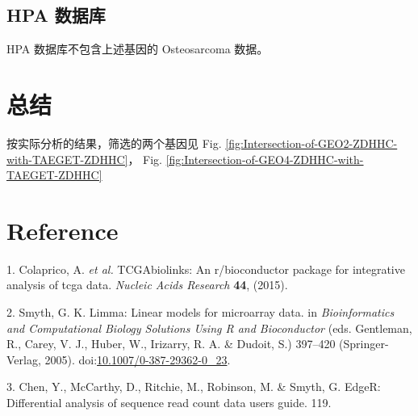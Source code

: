 \documentclass[
]{article}
\newenvironment{cslreferences}%
  {}%
  {\par}
\begin{document}
\hypertarget{hpa-ux6570ux636eux5e93}{%
\subsection{HPA 数据库}\label{hpa-ux6570ux636eux5e93}}

HPA 数据库不包含上述基因的 Osteosarcoma 数据。

\hypertarget{conclusion}{%
\section{总结}\label{conclusion}}

按实际分析的结果，筛选的两个基因见
Fig. \ref{fig:Intersection-of-GEO2-ZDHHC-with-TAEGET-ZDHHC}，
Fig. \ref{fig:Intersection-of-GEO4-ZDHHC-with-TAEGET-ZDHHC}

\hypertarget{bibliography}{%
\section*{Reference}\label{bibliography}}

\hypertarget{refs}{}
\begin{cslreferences}
\leavevmode\hypertarget{ref-TcgabiolinksAColapr2015}{}%
1. Colaprico, A. \emph{et al.} TCGAbiolinks: An r/bioconductor package for integrative analysis of tcga data. \emph{Nucleic Acids Research} \textbf{44}, (2015).

\leavevmode\hypertarget{ref-LimmaLinearMSmyth2005}{}%
2. Smyth, G. K. Limma: Linear models for microarray data. in \emph{Bioinformatics and Computational Biology Solutions Using R and Bioconductor} (eds. Gentleman, R., Carey, V. J., Huber, W., Irizarry, R. A. \& Dudoit, S.) 397--420 (Springer-Verlag, 2005). doi:\href{https://doi.org/10.1007/0-387-29362-0_23}{10.1007/0-387-29362-0\_23}.

\leavevmode\hypertarget{ref-EdgerDifferenChen}{}%
3. Chen, Y., McCarthy, D., Ritchie, M., Robinson, M. \& Smyth, G. EdgeR: Differential analysis of sequence read count data users guide. 119.
\end{cslreferences}
\end{document}
